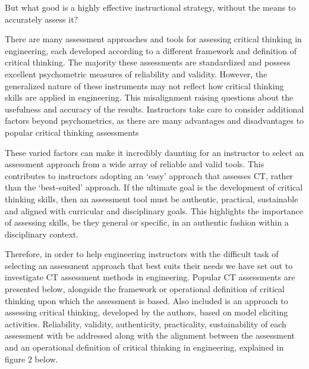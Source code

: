 But what good is a highly effective instructional strategy, without the means to accurately assess it?

There are many assessment approaches and tools for assessing critical thinking in engineering, each developed according to a different framework and definition of critical thinking.  The majority these assessments are standardized and possess excellent psychometric measures of reliability and validity.  However, the generalized nature of these instruments may not reflect how critical thinking skills are applied in engineering.  This misalignment raising questions about the usefulness and accuracy of the results.  Instructors take care to consider additional factors beyond psychometrics, as there are many advantages and disadvantages to popular critical thinking assessments\cite{Ku_2009}

These varied factors can make it incredibly daunting for an instructor to select an assessment approach from a wide array of reliable and valid tools.  This contributes to instructors adopting an ‘easy’ approach that assesses CT, rather than the ‘best-suited’ approach.  If the ultimate goal is the development of critical thinking skills, then an assessment tool must be authentic, practical, sustainable and aligned with curricular and disciplinary goals.  This highlights the importance of assessing skills, be they general or specific, in an authentic fashion within a disciplinary context.

Therefore, in order to help engineering instructors with the difficult task of selecting an assessment approach that best suits their needs we have set out to investigate CT assessment methods in engineering.  Popular CT assessments are presented below, alongside the framework or operational definition of critical thinking upon which the assessment is based.  Also included is an approach to assessing critical thinking, developed by the authors, based on model eliciting activities\cite{DiefesDux:2004fq, Kaupp:2014un}. Reliability, validity, authenticity, practicality, sustainability of each assessment with be addressed along with the alignment between the assessment and an operational definition of critical thinking in engineering, explained in figure 2 below.

